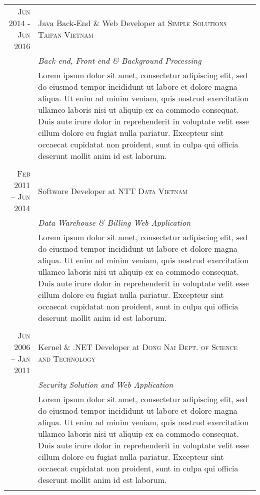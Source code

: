\documentclass[a4paper,10pt]{article}
\begin{document}
\begin{tabular}{r|p{11cm}}

    \textsc{Jun 2014 - Jun 2016} & Java Back-End \& Web Developer at \textsc{Simple Solutions Taipan Vietnam} \\&\emph{Back-end, Front-end \& Background Processing}\\&\footnotesize{Lorem ipsum dolor sit amet, consectetur adipiscing elit, sed do eiusmod tempor incididunt ut labore et dolore magna aliqua. Ut enim ad minim veniam, quis nostrud exercitation ullamco laboris nisi ut aliquip ex ea commodo consequat. Duis aute irure dolor in reprehenderit in voluptate velit esse cillum dolore eu fugiat nulla pariatur. Excepteur sint occaecat cupidatat non proident, sunt in culpa qui officia deserunt mollit anim id est laborum.}\\\multicolumn{2}{c}{} \\

    \textsc{Feb 2011 – Jun 2014} & Software Developer at \textsc{NTT Data Vietnam} \\&\emph{Data Warehouse \& Billing Web Application}\\&\footnotesize{Lorem ipsum dolor sit amet, consectetur adipiscing elit, sed do eiusmod tempor incididunt ut labore et dolore magna aliqua. Ut enim ad minim veniam, quis nostrud exercitation ullamco laboris nisi ut aliquip ex ea commodo consequat. Duis aute irure dolor in reprehenderit in voluptate velit esse cillum dolore eu fugiat nulla pariatur. Excepteur sint occaecat cupidatat non proident, sunt in culpa qui officia deserunt mollit anim id est laborum.}\\\multicolumn{2}{c}{} \\

    \textsc{Jun 2006 – Jan 2011} & Kernel \& .NET Developer at \textsc{Dong Nai Dept. of Science and Technology} \\&\emph{Security Solution and Web Application}\\&\footnotesize{Lorem ipsum dolor sit amet, consectetur adipiscing elit, sed do eiusmod tempor incididunt ut labore et dolore magna aliqua. Ut enim ad minim veniam, quis nostrud exercitation ullamco laboris nisi ut aliquip ex ea commodo consequat. Duis aute irure dolor in reprehenderit in voluptate velit esse cillum dolore eu fugiat nulla pariatur. Excepteur sint occaecat cupidatat non proident, sunt in culpa qui officia deserunt mollit anim id est laborum.}\\\multicolumn{2}{c}{} \\

\end{tabular}
\end{document}
